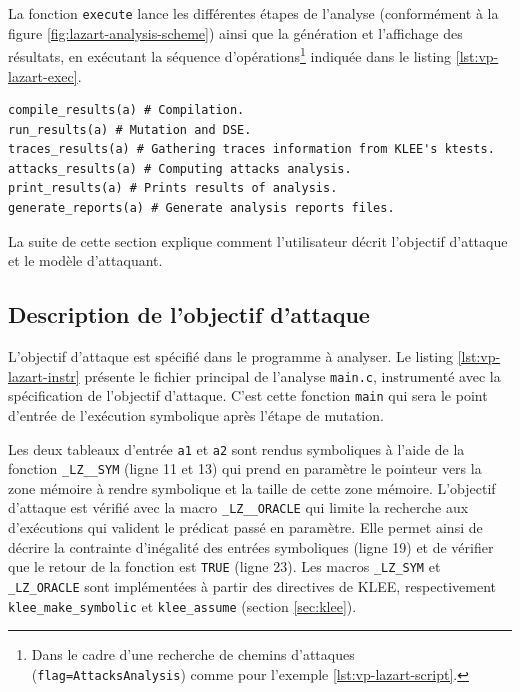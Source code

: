             La fonction \texttt{execute} lance les différentes étapes de l'analyse (conformément à la figure \ref{fig:lazart-analysis-scheme}) ainsi que la génération et l'affichage des résultats, en exécutant la séquence d'opérations\footnote{Dans le cadre d'une recherche de chemins d'attaques (\texttt{flag=AttacksAnalysis}) comme pour l'exemple \ref{lst:vp-lazart-script}.} indiquée dans le listing \ref{lst:vp-lazart-exec}. 
            
\begin{lstlisting}    
compile_results(a) # Compilation.
run_results(a) # Mutation and DSE.
traces_results(a) # Gathering traces information from KLEE's ktests.
attacks_results(a) # Computing attacks analysis.
print_results(a) # Prints results of analysis.
generate_reports(a) # Generate analysis reports files.
\end{lstlisting}
            
            La suite de cette section explique comment l'utilisateur décrit l'objectif d'attaque et le modèle d'attaquant.

        \subsection{Description de l'objectif d'attaque}
        \label{sec:lazart-phi}
        
            L'objectif d'attaque est spécifié dans le programme à analyser.
            Le listing \ref{lst:vp-lazart-instr} présente le fichier principal de l'analyse \texttt{main.c}, instrumenté avec la spécification de l'objectif d'attaque. C'est cette fonction \texttt{main} qui sera le point d'entrée de l'exécution symbolique après l'étape de mutation.
            
            Les deux tableaux d'entrée \texttt{a1} et \texttt{a2} sont rendus symboliques à l'aide de la fonction \texttt{\_LZ\_\_SYM} (ligne 11 et 13) qui prend en paramètre le pointeur vers la zone mémoire à rendre symbolique et la taille de cette zone mémoire.
            L'objectif d'attaque est vérifié avec la macro \texttt{\_LZ\_\_ORACLE} qui limite la recherche aux d'exécutions qui valident le prédicat passé en paramètre.
            Elle permet ainsi de décrire la contrainte d'inégalité des entrées symboliques (ligne 19) et de vérifier que le retour de la fonction est \texttt{TRUE} (ligne 23).
            Les macros \texttt{\_LZ\_SYM} et \texttt{\_LZ\_ORACLE} sont implémentées à partir des directives de KLEE, respectivement \texttt{klee\_make\_symbolic} et \texttt{klee\_assume} (section \ref{sec:klee}).
             
